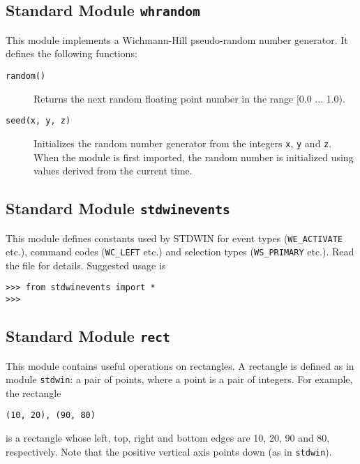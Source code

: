 \subsection{Standard Module {\tt whrandom}}

This module implements a Wichmann-Hill pseudo-random number generator.
It defines the following functions:
\begin{description}
\item[{\tt random()}]
Returns the next random floating point number in the range [0.0 ... 1.0).
\item[{\tt seed(x, y, z)}]
Initializes the random number generator from the integers
{\tt x},
{\tt y}
and
{\tt z}.
When the module is first imported, the random number is initialized
using values derived from the current time.
\end{description}

\subsection{Standard Module {\tt stdwinevents}}

This module defines constants used by STDWIN for event types
({\tt WE\_ACTIVATE} etc.), command codes ({\tt WC\_LEFT} etc.)
and selection types ({\tt WS\_PRIMARY} etc.).
Read the file for details.
Suggested usage is
\begin{code}\begin{verbatim}
>>> from stdwinevents import *
>>> 
\end{verbatim}\end{code}

\subsection{Standard Module {\tt rect}}

This module contains useful operations on rectangles.
A rectangle is defined as in module
{\tt stdwin}:
a pair of points, where a point is a pair of integers.
For example, the rectangle
\begin{code}\begin{verbatim}
(10, 20), (90, 80)
\end{verbatim}\end{code}
is a rectangle whose left, top, right and bottom edges are 10, 20, 90
and 80, respectively.
Note that the positive vertical axis points down (as in
{\tt stdwin}).

